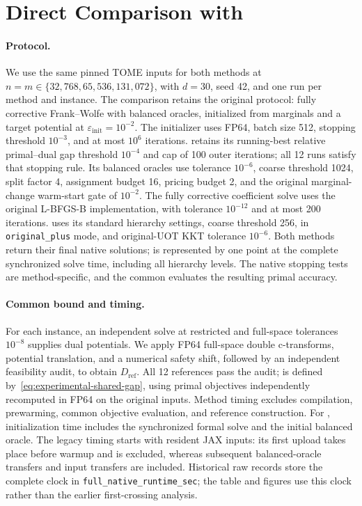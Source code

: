 \section{Direct Comparison with \hellouot}
\label{app:hello-uot-comparison}

\paragraph{Protocol.}
We use the same pinned TOME inputs for both methods at $n=m\in\{32{,}768,65{,}536,131{,}072\}$, with $d=30$, seed 42, and one run per method and instance.
The comparison retains the original \hellouot protocol: fully corrective Frank--Wolfe with balanced \hello oracles, initialized from \sinkhorn marginals and a target potential at $\varepsilon_{\mathrm{init}}=10^{-2}$.
The initializer uses FP64, batch size 512, stopping threshold $10^{-3}$, and at most $10^6$ iterations.
\hellouot retains its running-best relative primal--dual gap threshold $10^{-4}$ and cap of 100 outer iterations; all 12 runs satisfy that stopping rule.
Its balanced oracles use tolerance $10^{-6}$, coarse threshold 1024, split factor 4, assignment budget 16, pricing budget 2, and the original marginal-change warm-start gate of $10^{-2}$.
The fully corrective coefficient solve uses the original L-BFGS-B implementation, with tolerance $10^{-12}$ and at most 200 iterations.
\ours uses its standard hierarchy settings, coarse threshold 256, \subsolver in \texttt{original\_plus} mode, and original-UOT KKT tolerance $10^{-6}$.
Both methods return their final native solutions; \ours is represented by one point at the complete synchronized solve time, including all hierarchy levels.
The native stopping tests are method-specific, and the common \sharedgap evaluates the resulting primal accuracy.

\paragraph{Common bound and timing.}
For each instance, an independent \ours solve at restricted and full-space tolerances $10^{-8}$ supplies dual potentials.
We apply FP64 full-space double c-transforms, potential translation, and a numerical safety shift, followed by an independent feasibility audit, to obtain $D_{\mathrm{ref}}$.
All 12 references pass the audit; \sharedgap is defined by~\eqref{eq:experimental-shared-gap}, using primal objectives independently recomputed in FP64 on the original inputs.
Method timing excludes compilation, prewarming, common objective evaluation, and reference construction.
For \hellouot, initialization time includes the synchronized formal \sinkhorn solve and the initial balanced oracle.
The legacy \sinkhorn timing starts with resident JAX inputs: its first upload takes place before warmup and is excluded, whereas subsequent balanced-oracle transfers and \ours input transfers are included.
Historical raw records store the complete \ours clock in \texttt{full\_native\_runtime\_sec}; the table and figures use this clock rather than the earlier first-crossing analysis.

